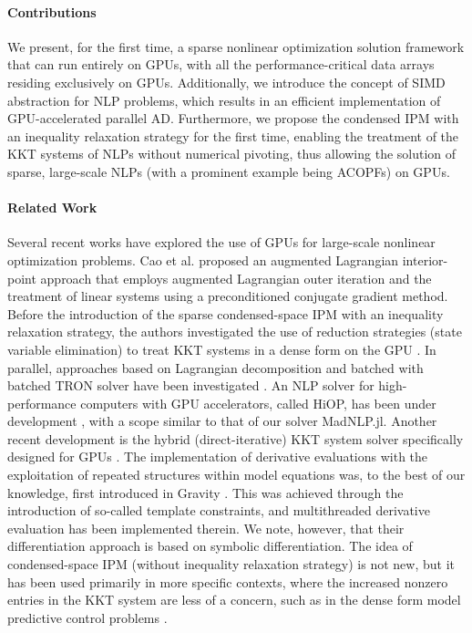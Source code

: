 \documentclass{IEEEtran4PSCC} %
\begin{document}
\paragraph*{Contributions}
We present, for the first time, a sparse nonlinear optimization
solution framework that can run entirely on GPUs, with all the
performance-critical data arrays residing exclusively on
GPUs. Additionally, we introduce the concept of SIMD abstraction for
NLP problems, which results in an efficient implementation of
GPU-accelerated parallel AD. Furthermore, we propose the condensed IPM
with an inequality relaxation strategy for the first time, enabling
the treatment of the KKT systems of NLPs without numerical pivoting,
thus allowing the solution of sparse, large-scale NLPs (with a prominent example being ACOPFs) on GPUs.

\paragraph*{Related Work}
Several recent works have explored the use of GPUs for large-scale
nonlinear optimization problems. Cao et al. \cite{cao2016augmented}
proposed an augmented Lagrangian interior-point approach that employs
augmented Lagrangian outer iteration and the treatment of linear
systems using a preconditioned conjugate gradient method. Before the
introduction of the sparse condensed-space IPM with an inequality relaxation
strategy, the authors  investigated the use of reduction
strategies (state variable elimination) to treat KKT systems in a
dense form on the GPU
\cite{pacaud2023parallel,pacaud2022feasible,pacaud2023accelerating}.
In parallel, approaches based on Lagrangian decomposition and
batched with batched TRON solver \cite{lin1999newton}
have been investigated \cite{kim2022accelerated,kim2021leveraging}.
An NLP solver for high-performance computers  with GPU
accelerators, called HiOP, has been under development
\cite{hiop_techrep}, with a scope similar to that of our solver MadNLP.jl.
 Another recent development is the hybrid (direct-iterative) KKT
system solver specifically designed for GPUs \cite{regev2023hykkt}.
The implementation of derivative evaluations with the exploitation of
repeated structures within model equations was, to the best of our
knowledge,  first introduced in Gravity \cite{Gravity}. This was
achieved through the introduction of so-called template constraints,
and multithreaded derivative evaluation has been implemented therein.
We note, however,  that their differentiation approach
is based on symbolic differentiation.
The idea of condensed-space IPM (without inequality relaxation
strategy) is not new, but it has been used primarily in more
specific contexts, where the increased nonzero entries in the KKT system
are less of a concern, such as in the dense form model predictive control
problems \cite{jerez2012sparse,cole2023exploiting}.
\end{document}
